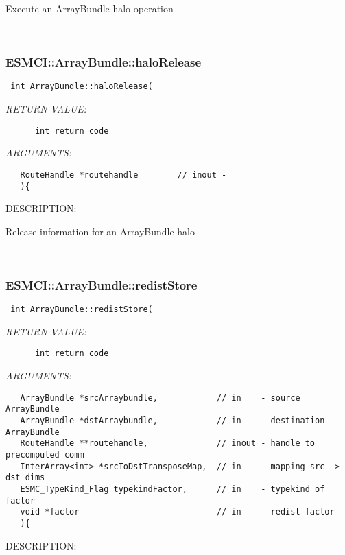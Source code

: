       Execute an ArrayBundle halo operation
   
 
\mbox{}\hrulefill\
 
\subsubsection [ESMCI::ArrayBundle::haloRelease] {ESMCI::ArrayBundle::haloRelease}


  
\begin{verbatim} int ArrayBundle::haloRelease(\end{verbatim}{\em RETURN VALUE:}
\begin{verbatim}      int return code\end{verbatim}{\em ARGUMENTS:}
\begin{verbatim}   RouteHandle *routehandle        // inout -
   ){    \end{verbatim}
{\sf DESCRIPTION:\\ }


      Release information for an ArrayBundle halo
   
 
\mbox{}\hrulefill\
 
\subsubsection [ESMCI::ArrayBundle::redistStore] {ESMCI::ArrayBundle::redistStore}


  
\begin{verbatim} int ArrayBundle::redistStore(\end{verbatim}{\em RETURN VALUE:}
\begin{verbatim}      int return code\end{verbatim}{\em ARGUMENTS:}
\begin{verbatim}   ArrayBundle *srcArraybundle,            // in    - source ArrayBundle
   ArrayBundle *dstArraybundle,            // in    - destination ArrayBundle
   RouteHandle **routehandle,              // inout - handle to precomputed comm
   InterArray<int> *srcToDstTransposeMap,  // in    - mapping src -> dst dims
   ESMC_TypeKind_Flag typekindFactor,      // in    - typekind of factor
   void *factor                            // in    - redist factor
   ){    \end{verbatim}
{\sf DESCRIPTION:\\ }


